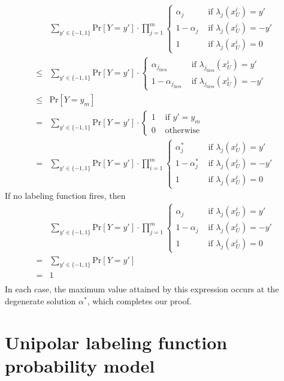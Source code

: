 \begin{align*}
    &\sum_{y'\in\{-1,1\}}\text{Pr}[Y=y']\cdot\prod_{j=1}^m\begin{cases}
        \alpha_j&\text{ if }\lambda_j(x^i_U)=y'\\
        1-\alpha_j&\text{ if }\lambda_j(x^i_U)=-y'\\
        1&\text{ if }\lambda_j(x^i_U)=0
    \end{cases}\\
    \leq&\sum_{y'\in\{-1,1\}}\text{Pr}[Y=y']\cdot\begin{cases}
        \alpha_{j_\text{fires}}&\text{ if }\lambda_{j_\text{fires}}(x^i_U)=y'\\
        1-\alpha_{j_\text{fires}}&\text{ if }\lambda_{j_\text{fires}}(x^i_U)=-y'
    \end{cases}\\
    \leq&\text{Pr}[Y=y_m]\\
    =&\sum_{y'\in\{-1,1\}}\text{Pr}[Y=y']\cdot\begin{cases}
        1&\text{ if }y'=y_m\\
        0&\text{ otherwise}
    \end{cases}\\
    =&\sum_{y'\in\{-1,1\}}\text{Pr}[Y=y']\cdot\prod_{i=1}^m\begin{cases}
        \alpha^*_j&\text{ if }\lambda_j(x^i_U)=y'\\
        1-\alpha^*_j&\text{ if }\lambda_j(x^i_U)=-y'\\
        1&\text{ if }\lambda_j(x^i_U)=0
    \end{cases}
\end{align*}
If no labeling function fires, then
\begin{align*}
    &\sum_{y'\in\{-1,1\}}\text{Pr}[Y=y']\cdot\prod_{j=1}^m\begin{cases}
        \alpha_j&\text{ if }\lambda_j(x^i_U)=y'\\
        1-\alpha_j&\text{ if }\lambda_j(x^i_U)=-y'\\
        1&\text{ if }\lambda_j(x^i_U)=0
    \end{cases}\\
    =&\sum_{y'\in\{-1,1\}}\text{Pr}[Y=y']\\
    =&1\\
\end{align*}
In each case, the maximum value attained by this expression occurs at the degenerate solution $\alpha^*$, which completes our proof.

\section{Unipolar labeling function probability model}
\label{appendix:unipolar_probs}

